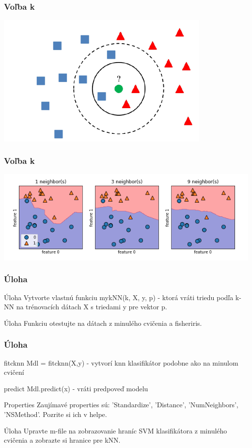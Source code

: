 \documentclass{beamer}
\begin{document}
\begin{frame}
\frametitle{Voľba k}
\center
\includegraphics[width=0.8\textwidth]{knn2.png}
\end{frame}

\begin{frame}
\frametitle{Voľba k}
\center
\includegraphics[width=1.1\textwidth]{knn.png}
\end{frame}


\begin{frame}
\frametitle{Úloha}
\begin{block}{Úloha}
Vytvorte vlastnú funkciu mykNN(k, X, y, p) - ktorá vráti triedu podľa k-NN na trénovacích dátach X s triedami y pre vektor p. 
\end{block}

\begin{block}{Úloha}
Funkciu otestujte na dátach z minulého cvičenia a fisheriris.
\end{block}
\end{frame}

\begin{frame}
\frametitle{Úloha}
\begin{block}{fitcknn}
Mdl = fitcknn(X,y) - vytvorí knn klasifikátor podobne ako na minulom cvičení 
\end{block}

\begin{block}{predict}
Mdl.predict(x) - vráti predpoveď modelu
\end{block}

\begin{block}{Properties}
Zaujímavé properties sú: 'Standardize', 'Distance', 'NumNeighbors', 'NSMethod'. Pozrite si ich v helpe.
\end{block}

\begin{block}{Úloha}
Upravte m-file na zobrazovanie hraníc SVM klasifikátora z minulého cvičenia a zobrazte si hranice pre kNN.
\end{block}
\end{frame}
\end{document}
